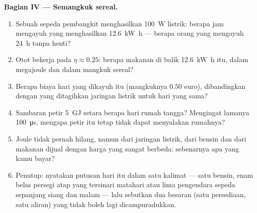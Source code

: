 \begin{problem}
\medskip
\noindent\textbf{Bagian IV --- Semangkuk sereal.}
\begin{enumerate}[resume]
  \item Sebuah sepeda pembangkit menghasilkan \qty{100}{W} listrik:
        berapa jam mengayuh yang menghasilkan \qty{12.6}{kW.h} ---
        berapa orang yang mengayuh \qty{24}{h} tanpa henti?
  \item Otot bekerja pada $\eta \approx 0.25$: berapa  makanan di
        balik \qty{12.6}{kW.h} itu, dalam megajoule dan dalam mangkuk
        sereal?
  \item Berapa biaya hari yang dikayuh itu (mangkuknya $0.50$ euro),
        dibandingkan dengan yang ditagihkan jaringan listrik untuk hari
        yang sama?
  \item Sambaran petir \qty{5}{GJ} setara berapa hari rumah tangga?
        Mengingat lamanya \qty{100}{\micro s}, mengapa petir itu tetap
        tidak dapat menyalakan rumahnya?
  \item Joule tidak pernah hilang, namun  dari jaringan listrik,
        dari bensin dan dari makanan dijual dengan harga yang sangat
        berbeda: sebenarnya apa yang kamu bayar?
  \item Penutup: nyatakan putusan hari itu dalam satu kalimat --- satu
         bensin, enam belas  persegi atap yang tersinari
        matahari atau lima pengendara sepeda sepanjang siang dan malam
        --- lalu sebutkan dua besaran (satu persediaan, satu aliran)
        yang tidak boleh lagi dicampuradukkan.
\end{enumerate}
\end{problem}
